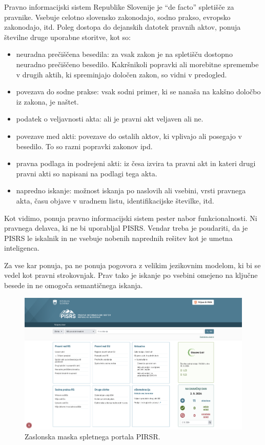 \documentclass[a4paper,12pt,openright]{book}
\begin{document}
Pravno informacijski sistem Republike Slovenije \cite{pisrs} je “de facto” spletišče za pravnike. Vsebuje celotno slovensko zakonodajo, sodno prakso, evropsko zakonodajo, itd. Poleg dostopa do dejanskih datotek pravnih aktov, ponuja številne druge uporabne storitve, kot so:

\begin{itemize}
    \item neuradna prečiščena besedila: za vsak zakon je na spletišču dostopno neuradno prečiščeno besedilo. Kakršnikoli popravki ali morebitne spremembe v drugih aktih, ki spreminjajo določen zakon, so vidni v predogled.
    \item povezava do sodne prakse: vsak sodni primer, ki se nanaša na kakšno določbo iz zakona, je naštet.
    \item podatek o veljavnosti akta: ali je pravni akt veljaven ali ne.
    \item povezave med akti: povezave do ostalih aktov, ki vplivajo ali posegajo v besedilo. To so razni popravki zakonov ipd.
    \item pravna podlaga in podrejeni akti: iz česa izvira ta pravni akt in kateri drugi pravni akti so napisani na podlagi tega akta.
    \item napredno iskanje: možnost iskanja po naslovih ali vsebini, vrsti pravnega akta, času objave v uradnem listu, identifikacijske številke, itd.
\end{itemize}

Kot vidimo, ponuja pravno informacijski sistem pester nabor funkcionalnosti. Ni pravnega delavca, ki ne bi uporabljal PISRS. Vendar treba je poudariti, da je PISRS le iskalnik in ne vsebuje nobenih naprednih rešitev kot je umetna inteligenca.

Za vse kar ponuja, pa ne ponuja pogovora z velikim jezikovnim modelom, ki bi se vedel kot pravni strokovnjak. Prav tako je iskanje po vsebini omejeno na ključne besede in ne omogoča semantičnega iskanja.

\begin{figure}[htbp]
    \centering
    \includegraphics[width=\textwidth]{pisrs.png}
    \caption{Zaslonska maska spletnega portala PIRSR.}
    \label{pisrs}
\end{figure}
\end{document}
